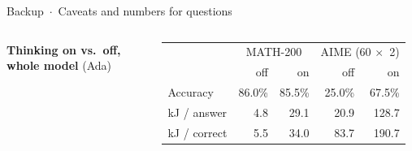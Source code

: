 \documentclass[aspectratio=169,9pt]{beamer}
\newcommand{\x}{$\times$}
\newcommand{\hd}[1]{{\color{accent}\bfseries #1}}
\begin{document}
\begin{frame}{Backup \,$\cdot$\, Caveats and numbers for questions}
\begin{columns}[T,onlytextwidth]
    \hd{Thinking on vs.\ off, whole model} {\scriptsize\color{muted}(Ada)}\\[2pt]
    \begin{tabular}{@{}lrrrr@{}}
      \toprule
      & \multicolumn{2}{c}{MATH-200} & \multicolumn{2}{c}{AIME (60 \x\ 2)} \\
      & off & on & off & on \\
      \midrule
      Accuracy & 86.0\% & 85.5\% & 25.0\% & 67.5\% \\
      kJ / answer & 4.8 & 29.1 & 20.9 & 128.7 \\
      kJ / correct & 5.5 & 34.0 & 83.7 & 190.7 \\
      \bottomrule
    \end{tabular}
  \end{columns}
\end{frame}
\end{document}
